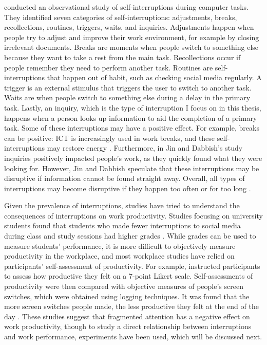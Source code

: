 \citet{Jin2009} conducted an observational study of self-interruptions during computer tasks. They identified seven categories of self-interruptions: adjustments, breaks, recollections, routines, triggers, waits, and inquiries. Adjustments happen when people try to adjust and improve their work environment, for example by closing irrelevant documents. Breaks are moments when people switch to something else because they want to take a rest from the main task. Recollections occur if people remember they need to perform another task. Routines are self-interruptions that happen out of habit, such as checking social media regularly. A trigger is an external stimulus that triggers the user to switch to another task. Waits are when people switch to something else during a delay in the primary task. Lastly, an inquiry, which is the type of interruption I focus on in this thesis, happens when a person looks up information to aid the completion of a primary task. Some of these interruptions may have a positive effect. For example, breaks can be positive: ICT is increasingly used in work breaks, and these self-interruptions may restore energy \citep{Skatova2016}. Furthermore, in Jin and Dabbish's study inquiries positively impacted people's work, as they quickly found what they were looking for. However, Jin and Dabbish speculate that these interruptions may be disruptive if information cannot be found straight away. Overall, all types of interruptions may become disruptive if they happen too often or for too long \citep{Mark2018}.

Given the prevalence of interruptions, studies have tried to understand the consequences of interruptions on work productivity. Studies focusing on university students found that students who made fewer interruptions to social media during class and study sessions had higher grades \citep{Carrier2015}. While grades can be used to measure students' performance, it is more difficult to objectively measure productivity in the workplace, and most workplace studies have relied on participants' self-assessment of productivity. For example, \citet{Mark2015} instructed participants to assess how productive they felt on a 7-point Likert scale. %
Self-assessments of productivity were then compared with objective measures of people's screen switches, which were obtained using logging techniques. It was found that the more screen switches people made, the less productive they felt at the end of the day \citep{Mark2015}. 
These studies suggest that fragmented attention has a negative effect on work productivity, though to study a direct relationship between interruptions and work performance, experiments have been used, which will be discussed next. 

